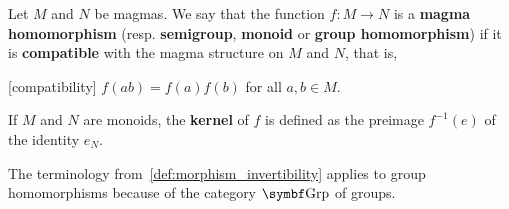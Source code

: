 \begin{definition}\label{def:magma_homomorphism}
  Let \( M \) and \( N \) be magmas. We say that the function \( f: M \to N \) is a \textbf{magma homomorphism} (resp. \textbf{semigroup}, \textbf{monoid} or \textbf{group homomorphism}) if it is \textbf{compatible} with the magma structure on \( M \) and \( N \), that is,
  \begin{description}
    [compatibility] \( f(ab) = f(a) f(b) \) for all \( a, b \in M \).
  \end{description}

  If \( M \) and \( N \) are monoids, the \textbf{kernel} of \( f \) is defined as the preimage \( f^{-1}(e) \) of the identity \( e_N \).

  The terminology from~\cref{def:morphism_invertibility} applies to group homomorphisms because of the category \( \Bold{Grp} \) of groups.
\end{definition}

